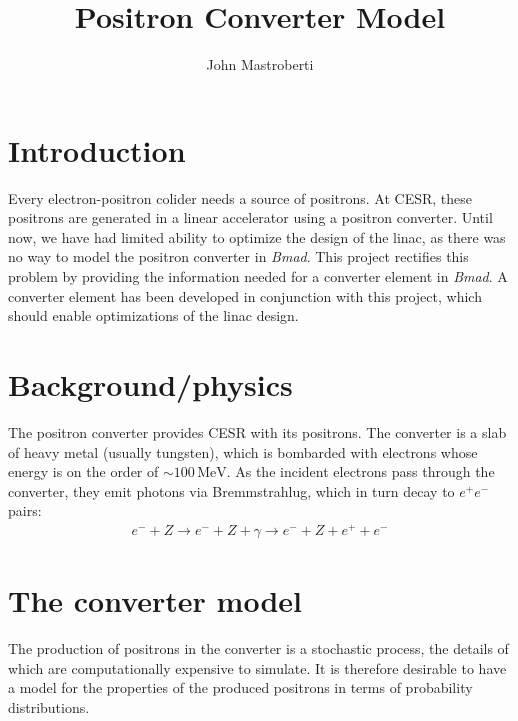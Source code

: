 \documentclass[12pt]{article}
\newcommand{\MeV}{\, \mathrm{MeV}}
\begin{document}
\title{Positron Converter Model}
\author{John Mastroberti}

\maketitle

\newcommand{\dxds}{\frac{dx}{ds}}
\newcommand{\dyds}{\frac{dy}{ds}}
\newcommand{\exes}{\texttt{converter\_simulation}}
\newcommand{\exef}{\texttt{converter\_fitter}}
\newcommand{\configfile}{\texttt{config.txt}}
\newcommand{\bmad}{\textit{Bmad}}

\tableofcontents

\newpage

\section{Introduction}

Every electron-positron colider needs a source of positrons.
At CESR, these positrons are generated in a linear accelerator using a positron converter.
Until now, we have had limited ability to optimize the design of the linac, as there was no way to model the positron converter in \bmad.
This project rectifies this problem by providing the information needed for a converter element in \bmad.
A converter element has been developed in conjunction with this project, which should enable optimizations of the linac design.


\section{Background/physics}
The positron converter provides CESR with its positrons.
The converter is a slab of heavy metal (usually tungsten), which is bombarded with electrons whose energy is on the order of $\sim 100 \MeV$.
As the incident electrons pass through the converter, they emit photons via Bremmstrahlug, which in turn decay to $e^+ e^-$ pairs:
\begin{align}
e^- + Z \rightarrow e^- + Z + \gamma \rightarrow e^- + Z + e^+ + e^-
\end{align}


\section{The converter model}
The production of positrons in the converter is a stochastic process, the details of which are computationally expensive to simulate.
It is therefore desirable to have a model for the properties of the produced positrons in terms of probability distributions.
\end{document}
